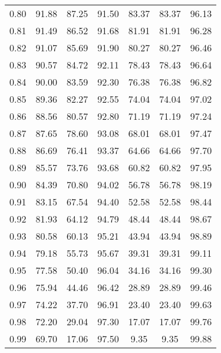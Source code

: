 \begin{tabular}{|c|c|c|c|c|c|c|}
      0.80 &     91.88 &     87.25 &      91.50 &   83.37 &      83.37 &         96.13 \\
      0.81 &     91.49 &     86.52 &      91.68 &   81.91 &      81.91 &         96.28 \\
      0.82 &     91.07 &     85.69 &      91.90 &   80.27 &      80.27 &         96.46 \\
      0.83 &     90.57 &     84.72 &      92.11 &   78.43 &      78.43 &         96.64 \\
      0.84 &     90.00 &     83.59 &      92.30 &   76.38 &      76.38 &         96.82 \\
      0.85 &     89.36 &     82.27 &      92.55 &   74.04 &      74.04 &         97.02 \\
      0.86 &     88.56 &     80.57 &      92.80 &   71.19 &      71.19 &         97.24 \\
      0.87 &     87.65 &     78.60 &      93.08 &   68.01 &      68.01 &         97.47 \\
      0.88 &     86.69 &     76.41 &      93.37 &   64.66 &      64.66 &         97.70 \\
      0.89 &     85.57 &     73.76 &      93.68 &   60.82 &      60.82 &         97.95 \\
      0.90 &     84.39 &     70.80 &      94.02 &   56.78 &      56.78 &         98.19 \\
      0.91 &     83.15 &     67.54 &      94.40 &   52.58 &      52.58 &         98.44 \\
      0.92 &     81.93 &     64.12 &      94.79 &   48.44 &      48.44 &         98.67 \\
      0.93 &     80.58 &     60.13 &      95.21 &   43.94 &      43.94 &         98.89 \\
      0.94 &     79.18 &     55.73 &      95.67 &   39.31 &      39.31 &         99.11 \\
      0.95 &     77.58 &     50.40 &      96.04 &   34.16 &      34.16 &         99.30 \\
      0.96 &     75.94 &     44.46 &      96.42 &   28.89 &      28.89 &         99.46 \\
      0.97 &     74.22 &     37.70 &      96.91 &   23.40 &      23.40 &         99.63 \\
      0.98 &     72.20 &     29.04 &      97.30 &   17.07 &      17.07 &         99.76 \\
      0.99 &     69.70 &     17.06 &      97.50 &    9.35 &       9.35 &         99.88 \\
\bottomrule
\end{tabular}

